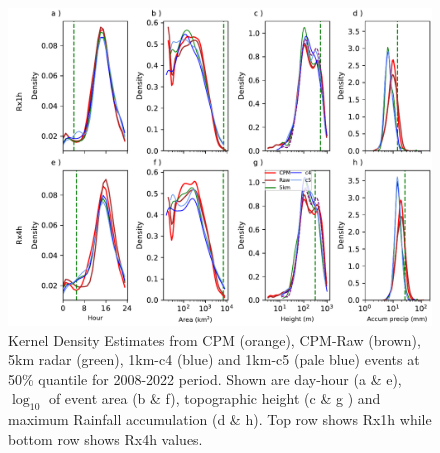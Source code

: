\documentclass[11pt,a4paper]{article}
\begin{document}
\begin{figure}
	\centering
	\includegraphics[width=\linewidth]{kde_smooth_events}
	\caption{Kernel Density Estimates from  CPM (orange), CPM-Raw (brown), 5km radar (green), 1km-c4 (blue) and 1km-c5 (pale blue) events at 50\% quantile for 2008-2022 period. Shown are day-hour (a \& e),$\log_{10}$ of event area (b \& f),  topographic height (c \& g ) and maximum Rainfall accumulation (d \& h). Top row shows Rx1h while bottom row shows Rx4h values.}
\end{figure}
\end{document}
